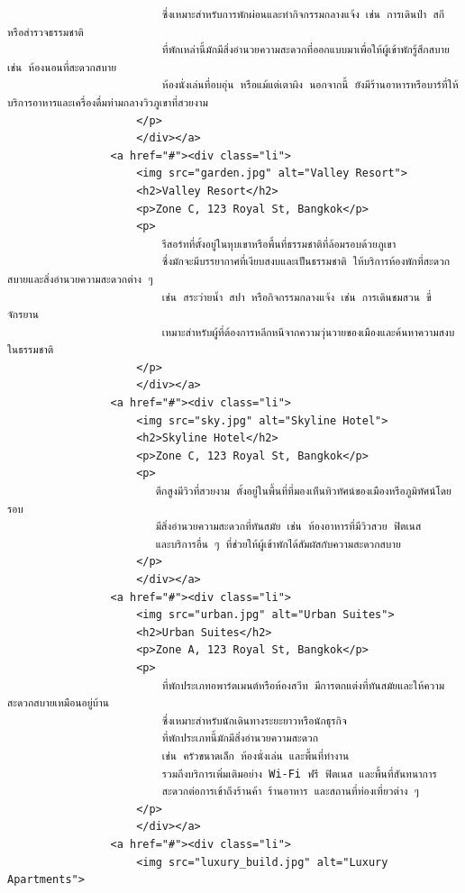 \documentclass{report}
\begin{document}
\begin{verbatim}
                        ซึ่งเหมาะสำหรับการพักผ่อนและทำกิจกรรมกลางแจ้ง เช่น การเดินป่า สกี หรือสำรวจธรรมชาติ
                        ที่พักเหล่านี้มักมีสิ่งอำนวยความสะดวกที่ออกแบบมาเพื่อให้ผู้เข้าพักรู้สึกสบาย เช่น ห้องนอนที่สะดวกสบาย 
                        ห้องนั่งเล่นที่อบอุ่น หรือแม้แต่เตาผิง นอกจากนี้ ยังมีร้านอาหารหรือบาร์ที่ให้บริการอาหารและเครื่องดื่มท่ามกลางวิวภูเขาที่สวยงาม     
                    </p>
                    </div></a>
                <a href="#"><div class="li">
                    <img src="garden.jpg" alt="Valley Resort">
                    <h2>Valley Resort</h2>
                    <p>Zone C, 123 Royal St, Bangkok</p>
                    <p>
                        รีสอร์ทที่ตั้งอยู่ในหุบเขาหรือพื้นที่ธรรมชาติที่ล้อมรอบด้วยภูเขา 
                        ซึ่งมักจะมีบรรยากาศที่เงียบสงบและเป็นธรรมชาติ ให้บริการห้องพักที่สะดวกสบายและสิ่งอำนวยความสะดวกต่าง ๆ 
                        เช่น สระว่ายน้ำ สปา หรือกิจกรรมกลางแจ้ง เช่น การเดินชมสวน ขี่จักรยาน 
                        เหมาะสำหรับผู้ที่ต้องการหลีกหนีจากความวุ่นวายของเมืองและค้นหาความสงบในธรรมชาติ     
                    </p>
                    </div></a>
                <a href="#"><div class="li">
                    <img src="sky.jpg" alt="Skyline Hotel">
                    <h2>Skyline Hotel</h2>
                    <p>Zone C, 123 Royal St, Bangkok</p>
                    <p>
                       ตึกสูงมีวิวที่สวยงาม ตั้งอยู่ในพื้นที่ที่มองเห็นทิวทัศน์ของเมืองหรือภูมิทัศน์โดยรอบ 
                       มีสิ่งอำนวยความสะดวกที่ทันสมัย เช่น ห้องอาหารที่มีวิวสวย ฟิตเนส 
                       และบริการอื่น ๆ ที่ช่วยให้ผู้เข้าพักได้สัมผัสกับความสะดวกสบาย     
                    </p>
                    </div></a>
                <a href="#"><div class="li">
                    <img src="urban.jpg" alt="Urban Suites">
                    <h2>Urban Suites</h2>
                    <p>Zone A, 123 Royal St, Bangkok</p>
                    <p>
                        ที่พักประเภทอพาร์ตเมนต์หรือห้องสวีท มีการตกแต่งที่ทันสมัยและให้ความสะดวกสบายเหมือนอยู่บ้าน 
                        ซึ่งเหมาะสำหรับนักเดินทางระยะยาวหรือนักธุรกิจ 
                        ที่พักประเภทนี้มักมีสิ่งอำนวยความสะดวก 
                        เช่น ครัวขนาดเล็ก ห้องนั่งเล่น และพื้นที่ทำงาน 
                        รวมถึงบริการเพิ่มเติมอย่าง Wi-Fi ฟรี ฟิตเนส และพื้นที่สันทนาการ 
                        สะดวกต่อการเข้าถึงร้านค้า ร้านอาหาร และสถานที่ท่องเที่ยวต่าง ๆ     
                    </p>
                    </div></a>
                <a href="#"><div class="li">
                    <img src="luxury_build.jpg" alt="Luxury Apartments">

\end{verbatim}
\end{document}

